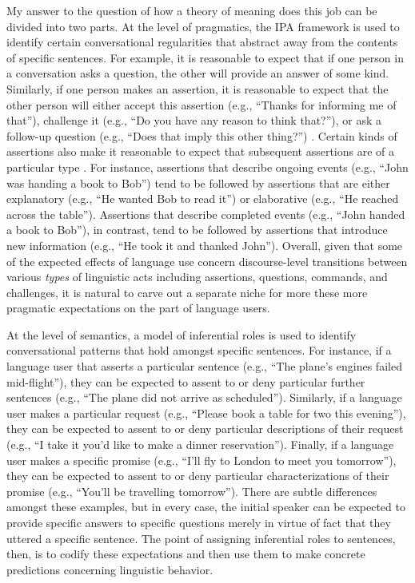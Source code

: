 My answer to the question of how a theory of meaning does this job can be divided into two parts. At the level of pragmatics, the IPA framework is used to identify certain conversational regularities that abstract away from the contents of specific sentences. For example, it is reasonable to expect that if one person in a conversation asks a question, the other will provide an answer of some kind. Similarly, if one person makes an assertion, it is reasonable to expect that the other person will either accept this assertion (e.g., ``Thanks for informing me of that''), challenge it (e.g., ``Do you have any reason to think that?''), or ask a follow-up question (e.g., ``Does that imply this other thing?'') \citep{Brandom:1994}. Certain kinds of assertions also make it reasonable to expect that subsequent assertions are of a particular type \citep{Rohde:2008}. For instance, assertions that describe ongoing events (e.g., ``John was handing a book to Bob'') tend to be followed by assertions that are either explanatory (e.g., ``He wanted Bob to read it'') or elaborative (e.g., ``He reached across the table''). Assertions that describe completed events (e.g., ``John handed a book to Bob''), in contrast, tend to be followed by assertions that introduce new information (e.g., ``He took it and thanked John''). Overall, given that some of the expected effects of language use concern discourse-level transitions between various \textit{types} of linguistic acts including assertions, questions, commands, and challenges, it is natural to carve out a separate niche for more these more pragmatic expectations on the part of language users. 

At the level of semantics, a model of inferential roles is used to identify conversational patterns that hold amongst specific sentences. For instance, if a language user that asserts a particular sentence (e.g., ``The plane's engines failed mid-flight''), they can be expected to assent to or deny particular further sentences (e.g., ``The plane did not arrive as scheduled''). Similarly, if a language user makes a particular request (e.g., ``Please book a table for two this evening''), they can be expected to assent to or deny particular descriptions of their request (e.g., ``I take it you'd like to make a dinner reservation''). Finally, if a language user makes a specific promise (e.g., ``I'll fly to London to meet you tomorrow''), they can be expected to assent to or deny particular characterizations of their promise (e.g., ``You'll be travelling tomorrow''). There are subtle differences amongst these examples, but in every case, the initial speaker can be expected to provide specific answers to specific questions merely in virtue of fact that they uttered a specific sentence. The point of assigning inferential roles to sentences, then, is to codify these expectations and then use them to make concrete predictions concerning linguistic behavior. 

